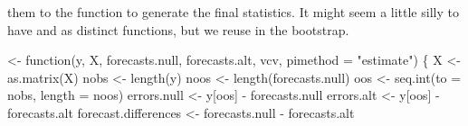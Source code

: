 \documentclass[10pt]{article}%
\begin{document}
them to the {\Tt{}\nwendquote} function to generate the
final statistics.  It might seem a little silly to have
{\Tt{}\nwendquote} and {\Tt{}\nwendquote} as distinct functions,
but we reuse {\Tt{}\nwendquote} in the bootstrap.

\nwenddocs{}\plusendmoddef\nwstartdeflinemarkup{}\nwenddeflinemarkup
{} <- function(y, X, forecasts.null, forecasts.alt, vcv,
                                    pimethod = "estimate") \{
  X <- as.matrix(X)
  nobs <- length(y)
  noos <- length(forecasts.null)
  oos <- seq.int(to = nobs, length = noos)
  errors.null <- y[oos] - forecasts.null
  errors.alt  <- y[oos] - forecasts.alt
  forecast.differences <- forecasts.null - forecasts.alt
\end{document}
